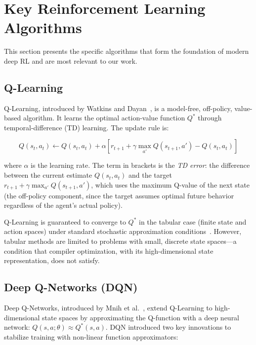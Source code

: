 \section{Key Reinforcement Learning Algorithms}

This section presents the specific algorithms that form the foundation of modern deep RL and are most relevant to our work.

\subsection{Q-Learning}

Q-Learning, introduced by Watkins and Dayan~\cite{watkins1992qlearning}, is a model-free, off-policy, value-based algorithm. It learns the optimal action-value function $Q^*$ through temporal-difference (TD) learning. The update rule is:

\begin{equation}
    Q(s_t, a_t) \leftarrow Q(s_t, a_t) + \alpha \left[ r_{t+1} + \gamma \max_{a'} Q(s_{t+1}, a') - Q(s_t, a_t) \right]
\end{equation}

where $\alpha$ is the learning rate. The term in brackets is the \textit{TD error}: the difference between the current estimate $Q(s_t, a_t)$ and the target $r_{t+1} + \gamma \max_{a'} Q(s_{t+1}, a')$, which uses the maximum Q-value of the next state (the off-policy component, since the target assumes optimal future behavior regardless of the agent's actual policy).

Q-Learning is guaranteed to converge to $Q^*$ in the tabular case (finite state and action spaces) under standard stochastic approximation conditions~\cite{watkins1992qlearning}. However, tabular methods are limited to problems with small, discrete state spaces—a condition that compiler optimization, with its high-dimensional state representation, does not satisfy.

\subsection{Deep Q-Networks (DQN)}

Deep Q-Networks, introduced by Mnih et al.~\cite{mnih2015human}, extend Q-Learning to high-dimensional state spaces by approximating the Q-function with a deep neural network: $Q(s, a; \theta) \approx Q^*(s, a)$. DQN introduced two key innovations to stabilize training with non-linear function approximators:

